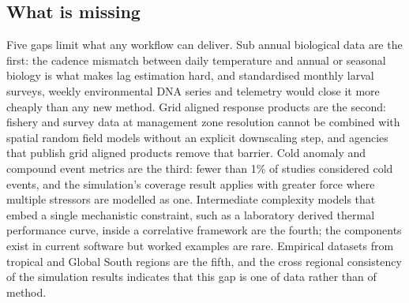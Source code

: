 \subsection{What is missing}\label{sec:gaps}

Five gaps limit what any workflow can deliver. Sub annual biological data are the first: the cadence mismatch between daily temperature and annual or seasonal biology is what makes lag estimation hard, and standardised monthly larval surveys, weekly environmental DNA series \citep{gold2024} and telemetry would close it more cheaply than any new method. Grid aligned response products are the second: fishery and survey data at management zone resolution cannot be combined with spatial random field models without an explicit downscaling step, and agencies that publish grid aligned products remove that barrier. Cold anomaly and compound event metrics are the third: fewer than 1\% of studies considered cold events, and the simulation's coverage result applies with greater force where multiple stressors are modelled as one. Intermediate complexity models that embed a single mechanistic constraint, such as a laboratory derived thermal performance curve, inside a correlative framework are the fourth; the components exist in current software but worked examples are rare. Empirical datasets from tropical and Global South regions are the fifth, and the cross regional consistency of the simulation results indicates that this gap is one of data rather than of method.
